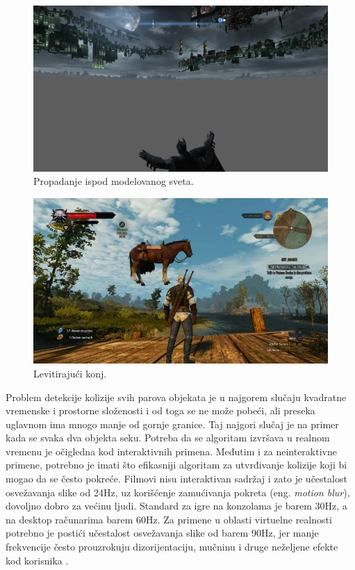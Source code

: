 \documentclass[12pt,oneside]{memoir}
\begin{document}
\begin{figure}[h!]
\centering
\includegraphics[scale=0.22]{batman.jpg}
\caption{Propadanje ispod modelovanog sveta.}
\label{fig:batman}
\end{figure}

\begin{figure}[h!]
	\centering
	\includegraphics[scale=0.54]{horse.png}
	\caption{Levitirajući konj.}
	\label{fig:horse}
\end{figure}

Problem detekcije kolizije svih parova objekata je u najgorem slučaju kvadratne vremenske i prostorne složenosti i od toga se ne može pobeći,
ali preseka uglavnom ima mnogo manje od gornje granice. Taj najgori slučaj je na primer kada se svaka dva objekta seku.
Potreba da se algoritam izvršava u realnom vremenu je očigledna kod interaktivnih primena.
Međutim i za neinteraktivne primene, potrebno je imati što efikasniji algoritam za utvrđivanje kolizije koji bi mogao da se često pokreće.
Filmovi nisu interaktivan sadržaj i zato je učestalost osvežavanja slike od 24Hz, uz korišćenje zamućivanja pokreta (eng. {\em motion blur}),
dovoljno dobro za većinu ljudi. Standard za igre na konzolama je barem 30Hz, a na desktop računarima  barem 60Hz. 
Za primene u oblasti virtuelne realnosti potrebno je postići učestalost osvežavanja slike od barem 90Hz, jer manje frekvencije često prouzrokuju
dizorijentaciju, mučninu i druge neželjene efekte kod korisnika \cite{importance}.
\end{document}
